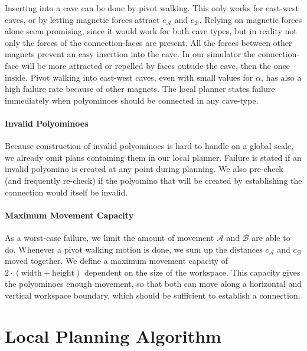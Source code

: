 Inserting into a cave can be done by pivot walking.
This only works for east-west caves, or by letting magnetic forces attract $e_\mathcal{A}$ and $e_\mathcal{B}$.
Relying on magnetic forces alone seem promising, since it would work for both cave types, but in reality not only the forces of the connection-faces are present.
All the forces between other magnets prevent an easy insertion into the cave.
In our simulator the connection-face will be more attracted or repelled by faces outside the cave, then the once inside.
Pivot walking into east-west caves, even with small values for $\alpha$, has also a high failure rate because of other magnets.
The local planner states failure immediately when polyominoes should be connected in any cave-type.

\paragraph{Invalid Polyominoes}

Because construction of invalid polyominoes is hard to handle on a global scale, we already omit plans containing them in our local planner.
Failure is stated if an invalid polyomino is created at any point during planning.
We also pre-check (and frequently re-check) if the polyomino that will be created by establishing the connection would itself be invalid. 

\paragraph{Maximum Movement Capacity}

As a worst-case failure, we limit the amount of movement $\mathcal{A}$ and $\mathcal{B}$ are able to do.
Whenever a pivot walking motion is done, we sum up the distances $c_\mathcal{A}$ and $c_\mathcal{B}$ moved together.
We define a maximum movement capacity of $2\cdot(\text{width} + \text{height})$ dependent on the size of the workspace.
This capacity gives the polyominoes enough movement, so that both can move along a horizontal and vertical workspace boundary, which should be sufficient to establish a connection.

\section{Local Planning Algorithm}
\label{sec:local_algo}

